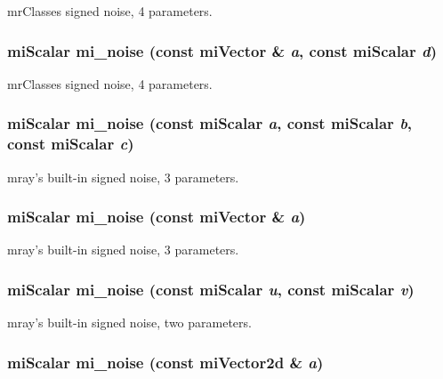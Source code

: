 mr\-Classes signed noise, 4 parameters. 

\subsubsection{\setlength{\rightskip}{0pt plus 5cm}mi\-Scalar mi\_\-noise (const mi\-Vector \& {\em a}, const mi\-Scalar {\em d})\hspace{0.3cm}{\tt  [inline]}}\label{namespacersl_a49}


mr\-Classes signed noise, 4 parameters. 

\subsubsection{\setlength{\rightskip}{0pt plus 5cm}mi\-Scalar mi\_\-noise (const mi\-Scalar {\em a}, const mi\-Scalar {\em b}, const mi\-Scalar {\em c})\hspace{0.3cm}{\tt  [inline]}}\label{namespacersl_a48}


mray's built-in signed noise, 3 parameters. 

\subsubsection{\setlength{\rightskip}{0pt plus 5cm}mi\-Scalar mi\_\-noise (const mi\-Vector \& {\em a})\hspace{0.3cm}{\tt  [inline]}}\label{namespacersl_a47}


mray's built-in signed noise, 3 parameters. 

\subsubsection{\setlength{\rightskip}{0pt plus 5cm}mi\-Scalar mi\_\-noise (const mi\-Scalar {\em u}, const mi\-Scalar {\em v})\hspace{0.3cm}{\tt  [inline]}}\label{namespacersl_a46}


mray's built-in signed noise, two parameters. 

\subsubsection{\setlength{\rightskip}{0pt plus 5cm}mi\-Scalar mi\_\-noise (const mi\-Vector2d \& {\em a})\hspace{0.3cm}{\tt  [inline]}}\label{namespacersl_a45}


